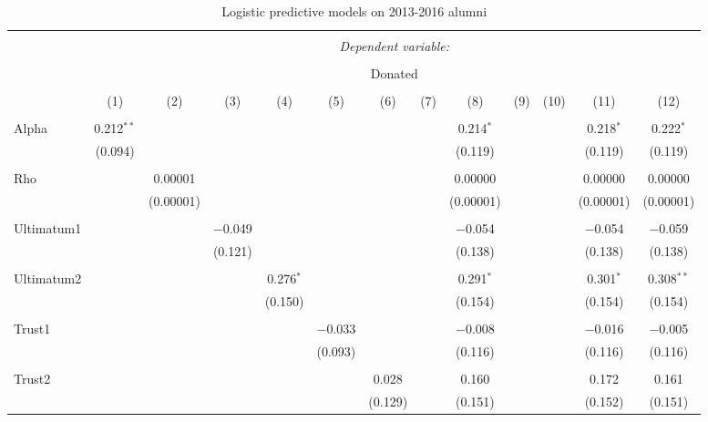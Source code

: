 \begin{table}[H] \centering 
  \caption{Logistic predictive models on 2013-2016 alumni} 
  \label{} 
  \begin{adjustbox}{width=\textwidth}
\begin{tabular}{@{\extracolsep{5pt}}lcccccccccccc} 
\\[-1.8ex]\hline 
\hline \\[-1.8ex] 
 & \multicolumn{12}{c}{\textit{Dependent variable:}} \\ 
\cline{2-13} 
\\[-1.8ex] & \multicolumn{12}{c}{Donated} \\ 
\\[-1.8ex] & (1) & (2) & (3) & (4) & (5) & (6) & (7) & (8) & (9) & (10) & (11) & (12)\\ 
\hline \\[-1.8ex] 
 Alpha & 0.212$^{**}$ &  &  &  &  &  &  & 0.214$^{*}$ &  &  & 0.218$^{*}$ & 0.222$^{*}$ \\ 
  & (0.094) &  &  &  &  &  &  & (0.119) &  &  & (0.119) & (0.119) \\ 
  & & & & & & & & & & & & \\ 
 Rho &  & 0.00001 &  &  &  &  &  & 0.00000 &  &  & 0.00000 & 0.00000 \\ 
  &  & (0.00001) &  &  &  &  &  & (0.00001) &  &  & (0.00001) & (0.00001) \\ 
  & & & & & & & & & & & & \\ 
 Ultimatum1 &  &  & $-$0.049 &  &  &  &  & $-$0.054 &  &  & $-$0.054 & $-$0.059 \\ 
  &  &  & (0.121) &  &  &  &  & (0.138) &  &  & (0.138) & (0.138) \\ 
  & & & & & & & & & & & & \\ 
 Ultimatum2 &  &  &  & 0.276$^{*}$ &  &  &  & 0.291$^{*}$ &  &  & 0.301$^{*}$ & 0.308$^{**}$ \\ 
  &  &  &  & (0.150) &  &  &  & (0.154) &  &  & (0.154) & (0.154) \\ 
  & & & & & & & & & & & & \\ 
 Trust1 &  &  &  &  & $-$0.033 &  &  & $-$0.008 &  &  & $-$0.016 & $-$0.005 \\ 
  &  &  &  &  & (0.093) &  &  & (0.116) &  &  & (0.116) & (0.116) \\ 
  & & & & & & & & & & & & \\ 
 Trust2 &  &  &  &  &  & 0.028 &  & 0.160 &  &  & 0.172 & 0.161 \\ 
  &  &  &  &  &  & (0.129) &  & (0.151) &  &  & (0.152) & (0.151) \\ 

\end{tabular}
\end{adjustbox}
\end{table}
